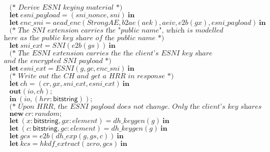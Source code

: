 \documentclass{article}
\newcommand{\kwl}[1]{\mathbf{#1}}
\newcommand{\kwt}[1]{\mathsf{#1}}
\newcommand{\var}[1]{\mathit{#1}}
\theoremstyle{definition}
\begin{document}
\begin{tabbing}
$\ \ \ \ \ \textit{(* Derive ESNI keying material *)} $\\
$\ \ \ \ \ \kwl{let}\ \var{esni{\_}payload} = (\var{sni{\_}nonce}, \var{sni})\ \kwl{in} $\\
$\ \ \ \ \ \kwl{let}\ \var{enc{\_}sni} = \var{aead{\_}enc}(\var{StrongAE}, \var{b2ae}(\var{aek}), \var{aeiv}, \var{e2b}(\var{gx}), \var{esni{\_}payload})\ \kwl{in} $\\
$ $\\
$\ \ \ \ \ \textit{(* The SNI extension carries the "public name", which is modelled }$\\
$\textit{        here as the public key share of the public name *)} $\\
$\ \ \ \ \ \kwl{let}\ \var{sni{\_}ext} = \var{SNI}(\var{e2b}(\var{gs}))\ \kwl{in} $\\
$ $\\
$\ \ \ \ \ \textit{(* The ESNI extension carries the the client's ESNI key share}$\\
$\textit{        and the encrypted SNI payload *)} $\\
$\ \ \ \ \ \kwl{let}\ \var{esni{\_}ext} = \var{ESNI}(\var{g}, \var{gc}, \var{enc{\_}sni})\ \kwl{in} $\\
$ $\\
$\ \ \ \ \ \textit{(* Write out the CH and get a HRR in response *)} $\\
$\ \ \ \ \ \kwl{let}\ \var{ch} = (\var{cr}, \var{gx}, \var{sni{\_}ext}, \var{esni{\_}ext})\ \kwl{in} $\\
$\ \ \ \ \ \kwl{out}(\var{io}, \var{ch}); $\\
$\ \ \ \ \ \kwl{in}\ (\var{io}, (\var{hrr}{:}\kwt{bitstring})); $\\
$ $\\
$\ \ \ \ \ \textit{(* Upon HRR, the ESNI payload does not change. Only the client's key shares change. *)} $\\
$\ \ \ \ \ \kwl{new}\ \var{cr}{:}\var{random}; $\\
$\ \ \ \ \ \kwl{let}\ (\var{x}{:}\kwt{bitstring}, \var{gx}{:}\var{element}) = \var{dh{\_}keygen}(\var{g})\ \kwl{in} $\\
$\ \ \ \ \ \kwl{let}\ (\var{c}{:}\kwt{bitstring}, \var{gc}{:}\var{element}) = \var{dh{\_}keygen}(\var{g})\ \kwl{in} $\\
$\ \ \ \ \ \kwl{let}\ \var{gcs} = \var{e2b}(\var{dh{\_}exp}(\var{g}, \var{gs}, \var{c}))\ \kwl{in} $\\
$\ \ \ \ \ \kwl{let}\ \var{kcs} = \var{hkdf{\_}extract}(\var{zero}, \var{gcs})\ \kwl{in} $\\

\end{tabbing}
\end{document}
